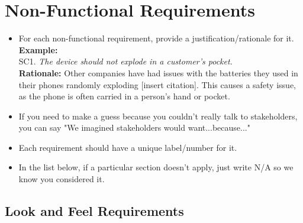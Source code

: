\documentclass[]{article}
\begin{document}

\section{Non-Functional Requirements}
\label{sec:non-functional_requirements}


\begin{itemize}
	\item For each non-functional requirement, provide a justification/rationale for it.\\
	{\bf Example:} \\
	SC1. \emph{The device should not explode in a customer’s pocket.}\\
	{\bf Rationale:} Other companies have had issues with the batteries they used in their phones randomly exploding [insert citation]. This causes a safety issue, as the phone is often carried in a person's hand or pocket.	
	\item If you need to make a guess because you couldn't really talk to stakeholders, you can say "We imagined stakeholders would want...because..."
	\item Each requirement should have a unique label/number for it.
	\item In the list below, if a particular section doesn't apply, just write N/A so we know you considered it.
\end{itemize}

\subsection{Look and Feel Requirements}
\label{sub:look_and_feel_requirements}
\end{document}
